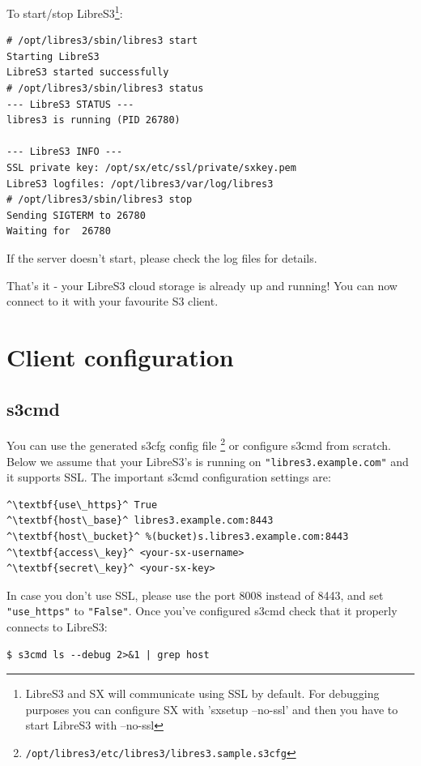 To start/stop LibreS3\footnote{LibreS3 and SX will communicate using SSL by
default. For debugging purposes you can configure SX with 'sxsetup --no-ssl' and then you have to start LibreS3 with --no-ssl}:

\small
\begin{lstlisting}
# /opt/libres3/sbin/libres3 start
Starting LibreS3
LibreS3 started successfully
# /opt/libres3/sbin/libres3 status
--- LibreS3 STATUS ---
libres3 is running (PID 26780)

--- LibreS3 INFO ---
SSL private key: /opt/sx/etc/ssl/private/sxkey.pem
LibreS3 logfiles: /opt/libres3/var/log/libres3
# /opt/libres3/sbin/libres3 stop
Sending SIGTERM to 26780
Waiting for  26780
\end{lstlisting}
\LARGE

If the server doesn't start, please check the log files for details.

That's it - your LibreS3 cloud storage is already up and running!
You can now connect to it with your favourite S3 client.

\chapter{Client configuration}
\section*{s3cmd}

You can use the generated s3cfg config file
\footnote{\verb|/opt/libres3/etc/libres3/libres3.sample.s3cfg|}
 or configure s3cmd from scratch. 
Below we assume that your LibreS3's
is running on \verb|"libres3.example.com"| and it supports SSL.
The important s3cmd configuration settings are:

\small
\begin{lstlisting}
^\textbf{use\_https}^ True
^\textbf{host\_base}^ libres3.example.com:8443
^\textbf{host\_bucket}^ %(bucket)s.libres3.example.com:8443
^\textbf{access\_key}^ <your-sx-username>
^\textbf{secret\_key}^ <your-sx-key>
\end{lstlisting}
\LARGE

In case you don't use SSL, please use the port 8008 instead of 8443, and set
\verb|"use_https"| to \verb|"False"|. Once you've configured s3cmd check
that it properly connects to LibreS3:
\small
\begin{lstlisting}
$ s3cmd ls --debug 2>&1 | grep host
\end{lstlisting}
\LARGE

